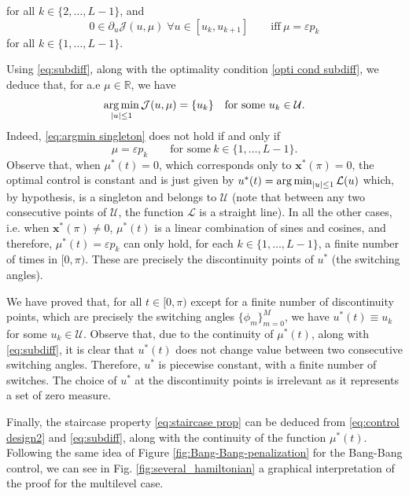 \documentclass[twocolumn]{autart}    %
\begin{document}
for all $k\in \{ 2, \ldots, L-1\}$,  and
\begin{equation}\label{eq:subdiff2}
	0\in \partial_u \mathcal{J} (u,\mu) \;\forall u\in [u_k, u_{k+1}] \qquad \text{iff} \ \mu= \varepsilon p_k
\end{equation}
for all $k\in \{ 1, \ldots, L-1 \}$.

Using \eqref{eq:subdiff}, along with the optimality condition \eqref{opti cond subdiff}, we deduce that, 
for a.e $\mu\in \mathbb{R}$, we have
\begin{equation}\label{eq:argmin singleton}
	\operatorname*{arg\,min}_{|u|\leq 1} \mathcal{J} (u,\mu) = \{u_k\} \quad \text{for some} \ u_k\in \mathcal{U}.
\end{equation}
Indeed,  \eqref{eq:argmin singleton} does not hold if and only if
\begin{equation}\label{eq:argmin non singleton}
	\mu = \varepsilon p_k \qquad \text{for some}\ k\in \{1,\ldots, L-1\}.
\end{equation}
Observe that, when $\mu^\ast(t) = 0$, which corresponds only to $\bm{x}^\ast(\pi) = 0$, the optimal control is constant and is just given by  $u^\ast (t) =  \operatorname*{arg\,min}_{|u|\leq 1} \mathcal{L}(u)$ which, by hypothesis, is a singleton and belongs to $\mathcal{U}$ (note that between any two consecutive points of $\mathcal{U}$, the function $\mathcal{L}$ is a straight line). In all the other cases,  i.e. when $\bm{x}^\ast(\pi)\neq 0$, $\mu^\ast(t)$ is a linear combination of sines and cosines, and therefore, $\mu^\ast (t) = \varepsilon p_k$ can only hold, for each $k\in \{  1, \ldots, L-1 \}$, a finite number of times in $[0,\pi)$. These are precisely the discontinuity points of $u^\ast$ (the switching angles).

We have proved that, for all $t\in [0,\pi)$ except for a finite number of discontinuity points, which are precisely the switching angles $\{\phi_m\}_{m=0}^M$, we have $u^\ast(t)\equiv u_k$ for some $u_k\in\mathcal U$. Observe that, due to the continuity of $\mu^\ast(t)$, along with \eqref{eq:subdiff}, it is clear that $u^\ast(t)$ does not change value between two consecutive switching angles. Therefore, $u^\ast$ is piecewise constant, with a finite number of switches. The choice of $u^\ast$ at the discontinuity points is irrelevant as it represents a set of zero measure.

Finally, the staircase property \eqref{eq:staircase prop} can be deduced from \eqref{eq:control design2} and \eqref{eq:subdiff}, along with the continuity of the function $\mu^\ast(t)$. Following the same idea of Figure \ref{fig:Bang-Bang-penalization} for the Bang-Bang control, we can see  in Fig. \ref{fig:several_hamiltonian} a graphical interpretation of the proof for the multilevel case.
\end{document}
